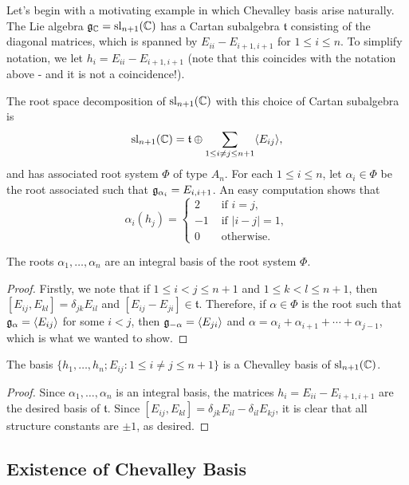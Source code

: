 Let's begin with a motivating example in which Chevalley basis arise naturally. The Lie algebra $\mathfrak{g}_{\mathbb{C}}=\mathrm{sl}_{n+1}(\mathbb{C})$ has a Cartan subalgebra $\mathfrak{t}$ consisting of the diagonal matrices, which is spanned by $E_{ii}-E_{i+1,i+1}$ for $1\leq i\leq n$. To simplify notation, we let $h_i=E_{ii}-E_{i+1,i+1}$ (note that this coincides with the notation above - and it is not a coincidence!).

The root space decomposition of $\mathrm{sl}_{n+1}(\mathbb{C})$ with this choice of Cartan subalgebra is 
$$\mathrm{sl}_{n+1}(\mathbb{C})=\mathfrak{t}\oplus\sum_{1\leq i\neq j\leq n+1}\langle E_{ij}\rangle,$$
and has associated root system $\Phi$ of type $A_n$. For each $1\leq i\leq n$, let $\alpha_i\in\Phi$ be the root associated such that $\mathfrak{g}_{\alpha_i}=E_{i,i+1}$. An easy computation shows that 
$$\alpha_i(h_j)=\begin{cases}
    2 & \text{ if } i=j,\\
    -1 & \text{ if } |i-j|=1,\\
    0 & \text{ otherwise.}
\end{cases}$$

\begin{lemma}
    The roots $\alpha_1,\ldots,\alpha_n$ are an integral basis of the root system $\Phi$.
\end{lemma}
\begin{proof}
    Firstly, we note that if $1\leq i<j\leq n+1$ and $1\leq k<l\leq n+1$, then $[E_{ij},E_{kl}]=\delta_{jk}E_{il}$ and $[E_{ij}-E_{ji}]\in\mathfrak{t}$. Therefore, if $\alpha\in\Phi$ is the root such that $\mathfrak{g}_\alpha=\langle E_{ij}\rangle$ for some $i<j$, then $\mathfrak{g}_{-\alpha}=\langle E_{ji}\rangle$ and $\alpha=\alpha_i+\alpha_{i+1}+\cdots+\alpha_{j-1}$, which is what we wanted to show.
\end{proof}

\begin{proposition}
    The basis $\{h_1,\ldots,h_n;E_{ij}:1\leq i\neq j\leq n+1\}$ is a Chevalley basis of $\mathrm{sl}_{n+1}(\mathbb{C})$.
\end{proposition}
\begin{proof}
    Since $\alpha_1,\ldots,\alpha_n$ is an integral basis, the matrices $h_i=E_{ii}-E_{i+1,i+1}$ are the desired basis of $\mathfrak{t}$. Since $[E_{ij},E_{kl}]=\delta_{jk}E_{il}-\delta_{il}E_{kj}$, it is clear that all structure constants are $\pm1$, as desired.
\end{proof}

\subsection{Existence of Chevalley Basis}


